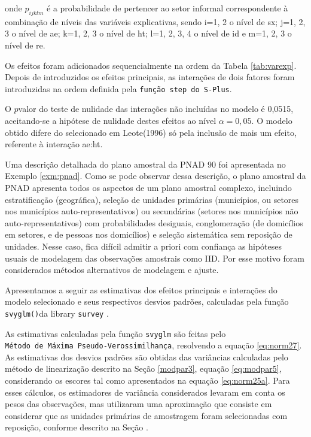 \documentclass[]{book}
\theoremstyle{definition}
\theoremstyle{definition}
\theoremstyle{definition}
\theoremstyle{remark}
\begin{document}
onde \(p_{ijklm}\) é a probabilidade de pertencer ao setor informal
correspondente à combinação de níveis das variáveis explicativas, sendo
i=1, 2 o nível de sx; j=1, 2, 3 o nível de ae; k=1, 2, 3 o nível de ht;
l=1, 2, 3, 4 o nível de id e m=1, 2, 3 o nível de re.

Os efeitos foram adicionados sequencialmente na ordem da Tabela
\ref{tab:varexp}. Depois de introduzidos os efeitos principais, as
interações de dois fatores foram introduzidas na ordem definida pela
\texttt{função\ step\ do\ S-Plus}.

O \(p\)valor do teste de nulidade das interações não incluídas no modelo
é 0,0515, aceitando-se a hipótese de nulidade destes efeitos ao nível
\(\alpha =0,05\). O modelo obtido difere do selecionado em Leote(1996)
só pela inclusão de mais um efeito, referente à interação ae:ht.

Uma descrição detalhada do plano amostral da PNAD 90 foi apresentada no
Exemplo \ref{exm:pnad}. Como se pode observar dessa descrição, o plano
amostral da PNAD apresenta todos os aspectos de um plano amostral
complexo, incluindo estratificação (geográfica), seleção de unidades
primárias (municípios, ou setores nos municípios auto-representativos)
ou secundárias (setores nos municípios não auto-representativos) com
probabilidades desiguais, conglomeração (de domicílios em setores, e de
pessoas nos domicílios) e seleção sistemática sem reposição de unidades.
Nesse caso, fica difícil admitir a priori com confiança as hipóteses
usuais de modelagem das observações amostrais como IID. Por esse motivo
foram considerados métodos alternativos de modelagem e ajuste.

Apresentamos a seguir as estimativas dos efeitos principais e interações
do modelo selecionado e seus respectivos desvios padrões, calculadas
pela função \texttt{svyglm()}da library \texttt{survey}
\citep{R-survey}.

As estimativas calculadas pela função \texttt{svyglm} são feitas pelo
\texttt{Método\ de\ Máxima\ Pseudo-Verossimilhança}, resolvendo a
equação \eqref{eq:norm27}. As estimativas dos desvios padrões são obtidas
das variâncias calculadas pelo método de linearização descrito na Seção
\ref{modpar3}, equação \eqref{eq:modpar5}, considerando os escores tal
como apresentados na equação \eqref{eq:norm25a}. Para esses cálculos, os
estimadores de variância considerados levaram em conta os pesos das
observações, mas utilizaram uma aproximação que consiste em considerar
que as unidades primárias de amostragem foram selecionadas com
reposição, conforme descrito na Seção .
\end{document}
